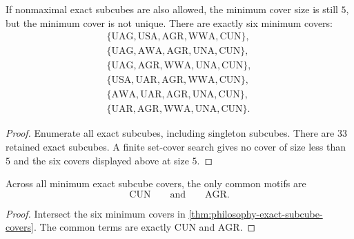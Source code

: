 \begin{theorem}
\label{thm:philosophy-exact-subcube-covers}
If nonmaximal exact subcubes are also allowed, the minimum cover size is
still $5$, but the minimum cover is not unique. There are exactly six
minimum covers:
$$
\begin{gathered}
  \{\mathrm{UAG},\mathrm{USA},\mathrm{AGR},\mathrm{WWA},\mathrm{CUN}\},\\
  \{\mathrm{UAG},\mathrm{AWA},\mathrm{AGR},\mathrm{UNA},\mathrm{CUN}\},\\
  \{\mathrm{UAG},\mathrm{AGR},\mathrm{WWA},\mathrm{UNA},\mathrm{CUN}\},\\
  \{\mathrm{USA},\mathrm{UAR},\mathrm{AGR},\mathrm{WWA},\mathrm{CUN}\},\\
  \{\mathrm{AWA},\mathrm{UAR},\mathrm{AGR},\mathrm{UNA},\mathrm{CUN}\},\\
  \{\mathrm{UAR},\mathrm{AGR},\mathrm{WWA},\mathrm{UNA},\mathrm{CUN}\}.
\end{gathered}
$$
\end{theorem}
\begin{proof}
Enumerate all exact subcubes, including singleton subcubes. There are
$33$ retained exact subcubes. A finite set-cover search gives no cover
of size less than $5$ and the six covers displayed above at size $5$.
\end{proof}

\begin{corollary}
\label{cor:philosophy-forced-support-motifs}
Across all minimum exact subcube covers, the only common motifs are
$$
  \mathrm{CUN}
  \qquad\text{and}\qquad
  \mathrm{AGR}.
$$
\end{corollary}
\begin{proof}
Intersect the six minimum covers in
\autoref{thm:philosophy-exact-subcube-covers}. The common terms are
exactly $\mathrm{CUN}$ and $\mathrm{AGR}$.
\end{proof}


